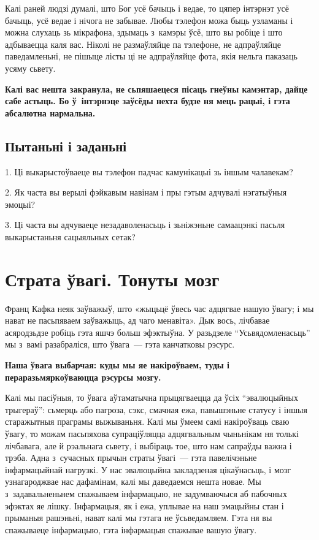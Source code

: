 Калі раней людзі думалі, што Бог усё бачыць і ведае, то цяпер інтэрнэт усё бачыць, усё ведае і нічога не забывае. Любы тэлефон можа быць узламаны і можна слухаць зь мікрафона, здымаць з~камэры ўсё, што вы робіце і што адбываецца каля вас. Ніколі не размаўляйце па тэлефоне, не адпраўляйце паведамленьні, не пішыце лісты ці не адпраўляйце фота, якія нельга паказаць усяму сьвету.

\textbf{Калі вас нешта закранула, не сьпяшаецеся пісаць гнеўны камэнтар, дайце сабе астыць. Бо ў~інтэрнэце заўсёды нехта будзе ня мець рацыі, і гэта абсалютна нармальна.}

\subsection*{Пытаньні і заданьні}

1. Ці выкарыстоўваеце вы тэлефон падчас камунікацыі зь іншым чалавекам?

2. Як часта вы верылі фэйкавым навінам і пры гэтым адчувалі нэгатыўныя эмоцыі?

3. Ці часта вы адчуваеце незадаволенасьць і зьніжэньне самаацэнкі пасьля выкарыстаньня сацыяльных сетак?


\section{Страта ўвагі. Тонуты мозг}

Франц Кафка неяк заўважыў, што «жыцьцё ўвесь час адцягвае нашую ўвагу; і мы нават не пасьпяваем заўважыць, ад чаго менавіта». Дык вось, лічбавае асяродзьдзе робіць гэта яшчэ больш эфэктыўна. У разьдзеле ``Усьвядомленасьць'' мы з~вамі разабраліся, што ўвага~--- гэта канчатковы рэсурс.

\textbf{Наша ўвага выбарчая: куды мы яе накіроўваем, туды і пераразьмяркоўваюцца рэсурсы мозгу.}

Калі мы пасіўныя, то ўвага аўтаматычна прыцягваецца да ўсіх ``эвалюцыйных трыгераў'': сьмерць або пагроза, сэкс, смачная ежа, павышэньне статусу і іншыя старажытныя праграмы выжываньня. Калі мы ўмеем самі накіроўваць сваю ўвагу, то можам пасьпяхова супраціўляцца адцягвальным чыньнікам ня толькі лічбавага, але й рэальнага сьвету, і выбіраць тое, што нам сапраўды важна і трэба. Адна з~сучасных прычын страты ўвагі~--- гэта павелічэньне інфармацыйнай нагрузкі. У нас эвалюцыйна закладзеная цікаўнасьць, і мозг узнагароджвае нас дафамінам, калі мы даведаемся нешта новае. Мы з~задавальненьнем спажываем інфармацыю, не задумваючыся аб пабочных эфэктах яе лішку. Інфармацыя, як і ежа, уплывае на наш эмацыйны стан і прыманыя рашэньні, нават калі мы гэтага не ўсьведамляем. Гэта ня вы спажываеце інфармацыю, гэта інфармацыя спажывае вашую ўвагу.

